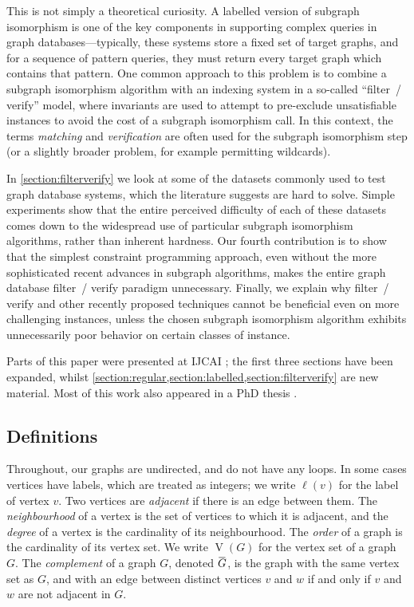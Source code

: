 \documentclass[twoside,11pt]{article}
\newcommand{\shortoverline}[1]{\mkern 1.5mu\overline{\mkern-1.5mu#1\mkern-1.5mu}\mkern 1.5mu}
\begin{document}
This is not simply a theoretical curiosity. A labelled version of subgraph isomorphism is one of
the key components in supporting complex queries in graph databases---typically, these systems store
a fixed set of target graphs, and for a sequence of pattern queries, they must return every target
graph which contains that pattern.  One common approach to this problem is to combine a subgraph
isomorphism algorithm with an indexing system in a so-called ``filter~/ verify'' model, where
invariants are used to attempt to pre-exclude unsatisfiable instances to avoid the cost of a
subgraph isomorphism call. In this context, the terms \emph{matching} and \emph{verification} are
often used for the subgraph isomorphism step (or a slightly broader problem, for example permitting
wildcards).

In \cref{section:filterverify} we look at some of the datasets commonly used to test graph database
systems, which the literature suggests are hard to solve. Simple experiments show that the entire
perceived difficulty of each of these datasets comes down to the widespread use of particular
subgraph isomorphism algorithms, rather than inherent hardness. Our fourth contribution is to show
that the simplest constraint programming approach, even without the more sophisticated recent
advances in subgraph algorithms, makes the entire graph database filter~/ verify paradigm
unnecessary.  Finally, we explain why filter~/ verify and other recently proposed techniques cannot
be beneficial even on more challenging instances, unless the chosen subgraph isomorphism algorithm
exhibits unnecessarily poor behavior on certain classes of instance.

\bigskip

Parts of this paper were presented at IJCAI \cite{DBLP:conf/ijcai/McCreeshPT16}; the first three
sections have been expanded, whilst
\cref{section:regular,section:labelled,section:filterverify} are new material. Most of this work
also appeared in a PhD thesis \cite{o:McCreesh17}.

\subsection{Definitions}

Throughout, our graphs are undirected, and do not have any loops. In some cases vertices have
labels, which are treated as integers; we write $\ell(v)$ for the label of vertex $v$. Two vertices
are \emph{adjacent} if there is an edge between them. The \emph{neighbourhood} of a vertex is the
set of vertices to which it is adjacent, and the \emph{degree} of a vertex is the cardinality of its
neighbourhood. The \emph{order} of a graph is the cardinality of its vertex set. We write
$\operatorname{V}(G)$ for the vertex set of a graph $G$. The \emph{complement} of a graph $G$,
denoted $\shortoverline{G}$, is the graph with the same vertex set as $G$, and with an edge between
distinct vertices $v$ and $w$ if and only if $v$ and $w$ are not adjacent in $G$.
\end{document}
